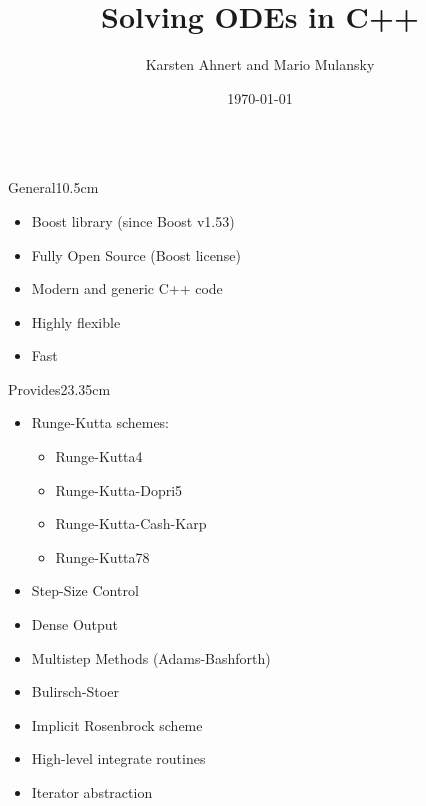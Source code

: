 \documentclass[final,hyperref={pdfpagelabels=false}]{beamer}
\title{Solving ODEs in C++}
\author{Karsten Ahnert and Mario Mulansky}
\institute[Uni Potsdam]{Institute of Physics and Astronomy, University of Potsdam}
\date{\today}
\begin{document}
  \begin{frame}[fragile]{} 

\vspace{-2cm}

\begin{columns}[t]
  \begin{column}{0.32\linewidth}
    \begin{blockwh}{General}{10.5cm}
      \begin{itemize}
	\item Boost library (since Boost v1.53)
	\item Fully Open Source (Boost license)
	\item Modern and generic C++ code
	\item Highly flexible
	\item Fast
      \end{itemize}
    \end{blockwh}
    
    \vspace{1cm}
    
    \begin{blockwh}{Provides}{23.35cm}
      \begin{itemize}
	\item Runge-Kutta schemes:
	\begin{itemize}
	  \item Runge-Kutta4
	  \item Runge-Kutta-Dopri5
	  \item Runge-Kutta-Cash-Karp
	  \item Runge-Kutta78
	\end{itemize}
	\item Step-Size Control
	\item Dense Output
	\item Multistep Methods (Adams-Bashforth)
	\item Bulirsch-Stoer
	\item Implicit Rosenbrock scheme
      \end{itemize}
      \vspace{1em}
      \begin{itemize}
       \item High-level integrate routines
       \item Iterator abstraction
      \end{itemize}

    \end{blockwh}
  \end{column}


\end{columns}
\end{frame}
\end{document}
